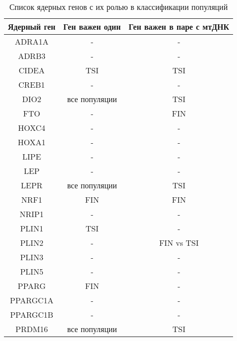 \begin{table} [htbp]
	\centering
	\begin{threeparttable}
		\caption{Список ядерных генов с их ролью в классификации популяций}%
		\label{tab:nuc_role}%
		\begin{SingleSpace}
			\begin{tabular}{| c | c | c |}
				\hline
				Ядерный ген & Ген важен один & Ген важен в паре с мтДНК \\ \hline
				ADRA1A        & -                   & -           \\ \hline
				ADRB3         & -                   & -           \\ \hline
				CIDEA         & TSI                 & TSI         \\ \hline
				CREB1         & -                   & -           \\ \hline
				DIO2          & все популяции       & TSI         \\ \hline
				FTO           & -                   & FIN         \\ \hline
				HOXC4         & -                   & -           \\ \hline
				HOXA1         & -                   & -           \\ \hline
				LIPE          & -                   & -           \\ \hline
				LEP           & -                   & -           \\ \hline
				LEPR          & все популяции       & TSI         \\ \hline
				NRF1          & FIN                 & FIN         \\ \hline
				NRIP1         & -                   & -           \\ \hline
				PLIN1         & TSI                 & -           \\ \hline
				PLIN2         & -                   & FIN vs TSI  \\ \hline
				PLIN3         & -                   & -           \\ \hline
				PLIN5         & -                   & -           \\ \hline
				PPARG         & FIN                 & -           \\ \hline
				PPARGC1A      & -                   & -           \\ \hline
				PPARGC1B      & -                   & -           \\ \hline
				PRDM16        & все популяции       & TSI         \\ \hline

\end{tabular}
\end{SingleSpace}
\end{threeparttable}
\end{table}
